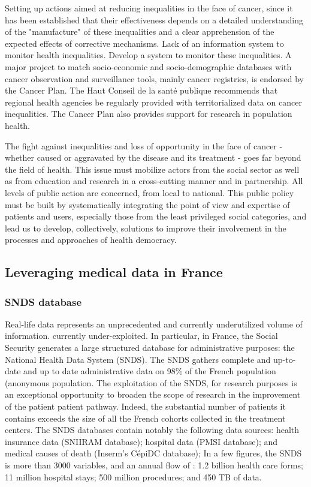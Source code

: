 Setting up actions aimed at reducing inequalities in the face of cancer, since
it has been established that their effectiveness depends on a detailed
understanding of the "manufacture" of these inequalities and a clear
apprehension of the expected effects of corrective mechanisms.
Lack of an information system to monitor health inequalities.
Develop a system to monitor these inequalities.
A major project to match socio-economic and
socio-demographic databases with cancer observation and surveillance tools,
mainly cancer registries, is endorsed by the Cancer Plan.
The Haut Conseil de la santé publique recommends that regional health
agencies be regularly provided with territorialized data on cancer
inequalities.
The Cancer Plan also provides support for
research in population health.

The fight against inequalities and loss of opportunity in the face of cancer -
whether caused or aggravated by the disease and its treatment - goes far beyond
the field of health. This issue must mobilize actors from the social sector as
well as from education and research in a cross-cutting manner and in
partnership. All levels of public action are concerned, from local to national.
This public policy must be built by systematically integrating the point of view
and expertise of patients and users, especially those from the least privileged
social categories, and lead us to develop, collectively, solutions to improve
their involvement in the processes and approaches of health democracy.

\subsection{Leveraging medical data in France}

\subsubsection{SNDS database}


Real-life data represents an unprecedented and currently underutilized volume of
information. currently under-exploited. In particular, in France, the Social
Security generates a large structured database for administrative purposes: the
National Health Data System (SNDS). The SNDS gathers complete and up-to-date and
up to date administrative data on 98\% of the French population (anonymous
population. The exploitation of the SNDS, for research purposes is an
exceptional opportunity to broaden the scope of research in the improvement of
the patient patient pathway. Indeed, the substantial number of patients it
contains exceeds the size of all the French cohorts collected in the treatment
centers.
The SNDS databases contain notably the following data sources:
health insurance data (SNIIRAM database);
hospital data (PMSI database);
and medical causes of death (Inserm's CépiDC database);
In a few figures, the SNDS is more than 3000 variables, and an annual flow of :
1.2 billion health care forms; 11 million hospital stays; 500 million
procedures; and 450 TB of data.

